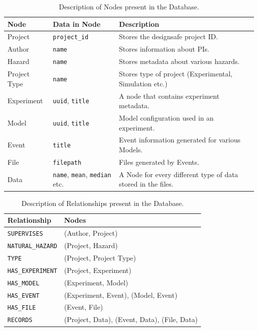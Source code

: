 \documentclass[acmsmall]{acmart}
\begin{document}
\begin{table}[h]
\caption{\label{table:nodes}Description of Nodes present in the Database.}
\centering
\begin{tabular}{lll}
\toprule
Node & Data in Node & Description\\[0pt]
\midrule
Project & \texttt{project\_id} & Stores the designsafe project ID.\\[0pt]
Author & \texttt{name} & Stores information about PIs.\\[0pt]
Hazard & \texttt{name} & Stores metadata about various hazards.\\[0pt]
Project Type & \texttt{name} & Stores type of project (Experimental, Simulation etc.)\\[0pt]
Experiment & \texttt{uuid}, \texttt{title} & A node that contains experiment metadata.\\[0pt]
Model & \texttt{uuid}, \texttt{title} & Model configuration used in an experiment.\\[0pt]
Event & \texttt{title} & Event information generated for various Models.\\[0pt]
File & \texttt{filepath} & Files generated by Events.\\[0pt]
Data & \texttt{name}, \texttt{mean}, \texttt{median} etc. & A Node for every different type of data stored in the files.\\[0pt]
\bottomrule
\end{tabular}
\end{table}

\begin{table}[htbp]
\caption{\label{table:relationships}Description of Relationships present in the Database.}
\centering
\begin{tabular}{ll}
\toprule
Relationship & Nodes\\[0pt]
\midrule
\texttt{SUPERVISES} & (Author, Project)\\[0pt]
\texttt{NATURAL\_HAZARD} & (Project, Hazard)\\[0pt]
\texttt{TYPE} & (Project, Project Type)\\[0pt]
\texttt{HAS\_EXPERIMENT} & (Project, Experiment)\\[0pt]
\texttt{HAS\_MODEL} & (Experiment, Model)\\[0pt]
\texttt{HAS\_EVENT} & (Experiment, Event), (Model, Event)\\[0pt]
\texttt{HAS\_FILE} & (Event, File)\\[0pt]
\texttt{RECORDS} & (Project, Data), (Event, Data), (File, Data)\\[0pt]
\bottomrule
\end{tabular}
\end{table}
\end{document}
